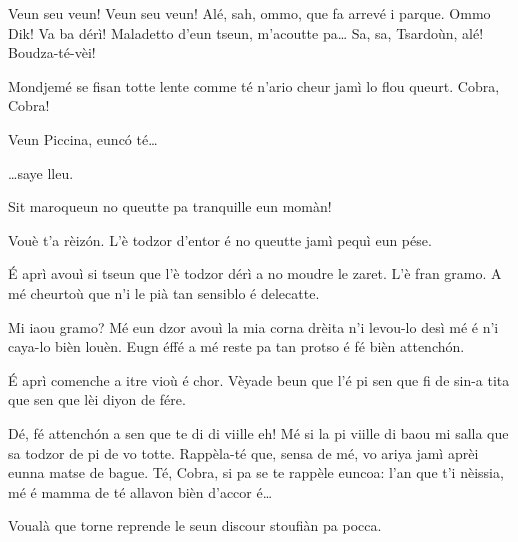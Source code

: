 \begin{drama}

\Sahlammspeaks Veun seu veun! Veun seu veun! Alé, sah, ommo, que fa arrevé i parque. Ommo Dik! Va ba dérì! Maladetto d'eun tseun, m'acoutte pa\ldots 
Sa, sa, Tsardoùn, alé! Boudza-té-vèi!


\Sahlammspeaks Mondjemé se fisan totte lente comme té n’ario cheur jamì lo flou queurt. Cobra, Cobra!


\Sahlammspeaks Veun Piccina, eunc\'o té\ldots


\Sahlammspeaks \ldots saye lleu.


\Piccinaspeaks Sit maroqueun no queutte pa tranquille eun momàn!

\Cobraspeaks  Vouè t’a rèiz\'on. L’è todzor d’entor é no queutte jamì pequì eun pése.

\Tzardounspeaks \'E aprì avouì si tseun que l’è todzor dérì a no moudre le zaret. L’è fran gramo. A mé cheurtoù que n’i le pià tan sensiblo é delecatte.

\Cobraspeaks Mi iaou gramo? Mé eun dzor avouì la mia corna drèita n’i levou-lo desì mé é n'i caya-lo bièn louèn.  Eugn éffé a mé reste pa tan protso é fé bièn attench\'on.

\Piccinaspeaks \'E aprì comenche a itre vioù é chor. Vèyade beun que l’é pi sen que fi de sin-a tita que sen que lèi diyon de fére.

\Tzardounspeaks Dé, fé attench\'on a sen que te di di viille eh! Mé si la pi viille di baou mi salla que sa todzor de pi de vo totte. Rappèla-té que, sensa de mé, vo ariya jamì aprèi eunna matse de bague. Té, Cobra, si pa se te rappèle euncoa: l’an que t’i nèissia, mé é mamma de té allavon bièn d’accor é\ldots

\Cobraspeaks Voualà que torne reprende le seun discour stoufiàn pa pocca.


\end{drama}
